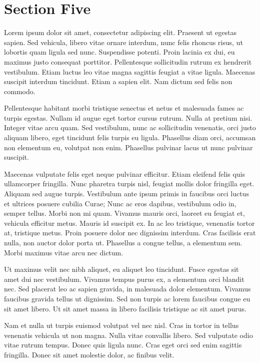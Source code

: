 \documentclass[runningheads,a4paper]{llncs}
\begin{document}
\section{Section Five}
%
Lorem ipsum dolor sit amet, consectetur adipiscing elit. Praesent ut egestas sapien. Sed vehicula, libero vitae ornare interdum, nunc felis rhoncus risus, ut lobortis quam ligula sed nunc. Suspendisse potenti. Proin lacinia ex dui, eu maximus justo consequat porttitor. Pellentesque sollicitudin rutrum ex hendrerit vestibulum. Etiam luctus leo vitae magna sagittis feugiat a vitae ligula. Maecenas suscipit interdum tincidunt. Etiam a sapien elit. Nam dictum sed felis non commodo.

Pellentesque habitant morbi tristique senectus et netus et malesuada fames ac turpis egestas. Nullam id augue eget tortor cursus rutrum. Nulla at pretium nisi. Integer vitae arcu quam. Sed vestibulum, nunc ac sollicitudin venenatis, orci justo aliquam libero, eget tincidunt felis turpis eu ligula. Phasellus diam orci, accumsan non elementum eu, volutpat non enim. Phasellus pulvinar lacus ut nunc pulvinar suscipit.

Maecenas vulputate felis eget neque pulvinar efficitur. Etiam eleifend felis quis ullamcorper fringilla. Nunc pharetra turpis nisl, feugiat mollis dolor fringilla eget. Aliquam sed augue turpis. Vestibulum ante ipsum primis in faucibus orci luctus et ultrices posuere cubilia Curae; Nunc ac eros dapibus, vestibulum odio in, semper tellus. Morbi non mi quam. Vivamus mauris orci, laoreet eu feugiat et, vehicula efficitur metus. Mauris id suscipit ex. In ac leo tristique, venenatis tortor at, tristique metus. Proin posuere dolor nec dignissim interdum. Cras facilisis erat nulla, non auctor dolor porta ut. Phasellus a congue tellus, a elementum sem. Morbi maximus vitae arcu nec dictum.

Ut maximus velit nec nibh aliquet, eu aliquet leo tincidunt. Fusce egestas sit amet dui nec vestibulum. Vivamus tempus purus ex, a elementum orci blandit nec. Sed placerat leo ac sapien gravida, in malesuada dolor elementum. Vivamus faucibus gravida tellus ut dignissim. Sed non turpis ac lorem faucibus congue eu sit amet libero. Ut sit amet massa in libero facilisis tristique ac sit amet purus.

Nam et nulla ut turpis euismod volutpat vel nec nisl. Cras in tortor in tellus venenatis vehicula ut non magna. Nulla vitae convallis libero. Sed vulputate odio vitae rutrum tempus. Donec quis ligula nunc. Cras eget orci sed enim sagittis fringilla. Donec sit amet molestie dolor, ac finibus velit.
%
\newpage
%
\end{document}

